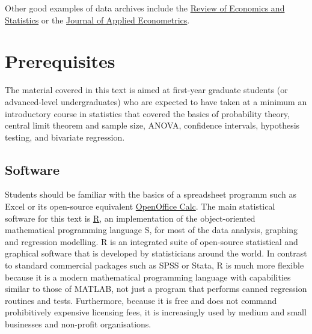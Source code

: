 Other good examples of data archives include the \href{http://thedata.harvard.edu/dvn/dv/restat}{Review of Economics and Statistics} or the \href{http://econ.queensu.ca/jae/}{Journal of Applied Econometrics}. 

\section{Prerequisites}
The material covered in this text is aimed at first-year graduate students (or advanced-level undergraduates) who are expected to have taken at a minimum an introductory course in statistics that covered the basics of probability theory, central limit theorem and sample size, ANOVA, confidence intervals, hypothesis testing, and bivariate regression.

\subsection{Software}
Students should be familiar with the basics of a spreadsheet programm such as Excel or its open-source equivalent \href{http://www.openoffice.org/product/calc.html}{OpenOffice Calc}. The main statistical software for this text is \href{http://www.r-project.org}{\textsf{R}}, an implementation of the object-oriented mathematical programming language \textsf{S},  for most of the data analysis, graphing and regression modelling. \textsf{R} is an integrated suite of open-source statistical and graphical software that is developed by statisticians around the world. In contrast to standard commercial packages such as \textsf{SPSS} or \textsf{Stata}, \textsf{R} is much more flexible because it is a modern mathematical programming language with capabilities similar to those of \textsf{MATLAB}, not just a program that performs canned regression routines and tests. Furthermore, because it is free and does not command prohibitively expensive licensing fees, it is increasingly used by medium and small businesses and non-profit organisations.

